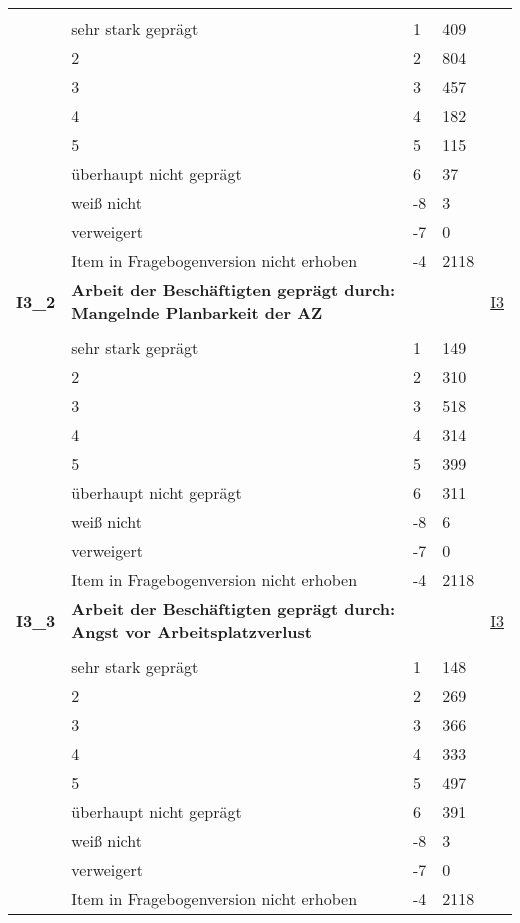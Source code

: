 \begin{longtable}{| L{2.5cm} | L{8.25cm}| C{1.5cm} | R{1.25cm} | C{2.25cm} |  }
   &  &  &  &  \\ 
   & sehr stark geprägt & 1 & 409 &  \\ 
   & 2 & 2 & 804 &  \\ 
   & 3 & 3 & 457 &  \\ 
   & 4 & 4 & 182 &  \\ 
   & 5 & 5 & 115 &  \\ 
   & überhaupt nicht geprägt & 6 & 37 &  \\ 
   & weiß nicht & -8 & 3 &  \\ 
   & verweigert & -7 & 0 &  \\ 
   & Item in Fragebogenversion nicht erhoben & -4 & 2118 &  \\ 
   \midrule
\textbf{I3\_2}\label{var:suf:I3:2} & \textbf{Arbeit der Beschäftigten geprägt durch: Mangelnde Planbarkeit der AZ} &  &  & \hyperref[I3]{I3} \\ 
   &  &  &  &  \\ 
   & sehr stark geprägt & 1 & 149 &  \\ 
   & 2 & 2 & 310 &  \\ 
   & 3 & 3 & 518 &  \\ 
   & 4 & 4 & 314 &  \\ 
   & 5 & 5 & 399 &  \\ 
   & überhaupt nicht geprägt & 6 & 311 &  \\ 
   & weiß nicht & -8 & 6 &  \\ 
   & verweigert & -7 & 0 &  \\ 
   & Item in Fragebogenversion nicht erhoben & -4 & 2118 &  \\ 
   \midrule
\textbf{I3\_3}\label{var:suf:I3:3} & \textbf{Arbeit der Beschäftigten geprägt durch: Angst vor Arbeitsplatzverlust} &  &  & \hyperref[I3]{I3} \\ 
   &  &  &  &  \\ 
   & sehr stark geprägt & 1 & 148 &  \\ 
   & 2 & 2 & 269 &  \\ 
   & 3 & 3 & 366 &  \\ 
   & 4 & 4 & 333 &  \\ 
   & 5 & 5 & 497 &  \\ 
   & überhaupt nicht geprägt & 6 & 391 &  \\ 
   & weiß nicht & -8 & 3 &  \\ 
   & verweigert & -7 & 0 &  \\ 
   & Item in Fragebogenversion nicht erhoben & -4 & 2118 &  \\ 

\end{longtable}
